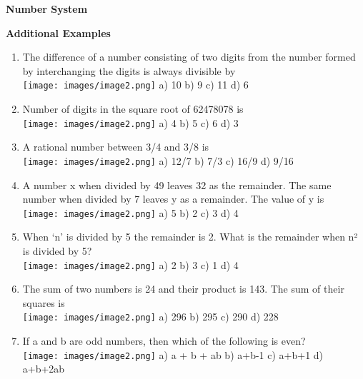 \documentclass[
]{article}
\author{}
\date{}
\begin{document}
\begin{center}
	{\Large \textbf{Number System \\}}
\end{center}
\textbf{Additional Examples \\}
\begin{enumerate}
	

 \item The difference of a number consisting of two digits from the number formed by interchanging the digits is always divisible by \\
\texttt{[image: images/image2.png]} a) 10 	b) 9 	c) 11 d) 6
 
\item Number of digits in the square root of 62478078 is \\
\texttt{[image: images/image2.png]} a) 4 	b) 5 	c) 6 	d) 3

\item A rational number between 3/4 and 3/8 is \\
\texttt{[image: images/image2.png]} a) 12/7 	b) 7/3 	c) 16/9 	d) 9/16

\item A number x when divided by 49 leaves 32 as the remainder. The same number when divided by 7 leaves y as a remainder. The value of y is 	\\
\texttt{[image: images/image2.png]} a) 5 	b) 2 	c) 3 	d) 4

	\item When ‘n’ is divided by 5 the remainder is 2. What is the remainder when n² is divided by 5? \\
	\texttt{[image: images/image2.png]} a) 2 	b) 3 	c) 1 	d) 4
	
	\item The sum of two numbers is 24 and their product is 143. The sum of their squares is \\
	\texttt{[image: images/image2.png]} a) 296 	b) 295 	c) 290 	d) 228
	
\item If a and b are odd numbers, then which of the following is even? \\
\texttt{[image: images/image2.png]} a) a + b + ab 	b) a+b-1 	c) a+b+1 	d) a+b+2ab




\end{enumerate}
\end{document}
